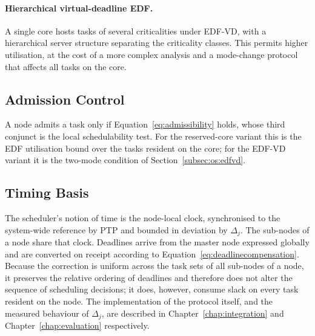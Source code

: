 \paragraph{Hierarchical virtual-deadline EDF.} A single core hosts tasks of
several criticalities under EDF-VD, with a hierarchical server structure
separating the criticality classes. This permits higher utilisation, at the
cost of a more complex analysis and a mode-change protocol that affects all
tasks on the core.

\subsection{Admission Control}\label{subsec:os:admission}

A node admits a task only if Equation~\ref{eq:admissibility} holds, whose
third conjunct is the local schedulability test. For the reserved-core variant
this is the EDF utilisation bound over the tasks resident on the core; for the
EDF-VD variant it is the two-mode condition of
Section~\ref{subsec:os:edfvd}.

\subsection{Timing Basis}\label{subsec:os:timing}

The scheduler's notion of time is the node-local clock, synchronised to the
system-wide reference by PTP and bounded in deviation by $\Delta_j$. The
sub-nodes of a node share that clock. Deadlines
arrive from the master node expressed globally and are converted on receipt
according to Equation~\ref{eq:deadlinecompensation}. Because the correction is
uniform across the task sets of all sub-nodes of a node, it preserves the
relative ordering of deadlines and therefore does not alter the sequence of scheduling decisions;
it does, however, consume slack on every task resident on the node. The
implementation of the protocol itself, and the measured behaviour of
$\Delta_j$, are described in Chapter~\ref{chap:integration} and
Chapter~\ref{chap:evaluation} respectively.

